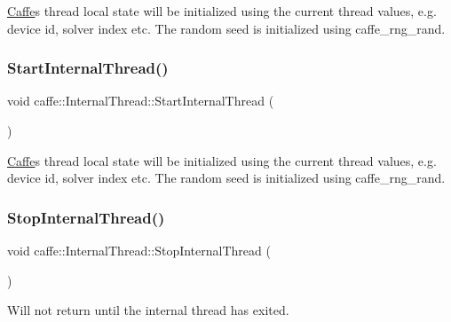 \mbox{\hyperlink{classcaffe_1_1_caffe}{Caffe}}\textquotesingle{}s thread local state will be initialized using the current thread values, e.\+g. device id, solver index etc. The random seed is initialized using caffe\+\_\+rng\+\_\+rand. \mbox{\label{classcaffe_1_1_internal_thread_acffc1d9bc9e78f4146ba2d16f593fca7}} 
\subsubsection{\texorpdfstring{Start\+Internal\+Thread()}{StartInternalThread()}\hspace{0.1cm}{\footnotesize\ttfamily [2/2]}}
{\footnotesize\ttfamily void caffe\+::\+Internal\+Thread\+::\+Start\+Internal\+Thread (\begin{DoxyParamCaption}{ }\end{DoxyParamCaption})}

\mbox{\hyperlink{classcaffe_1_1_caffe}{Caffe}}\textquotesingle{}s thread local state will be initialized using the current thread values, e.\+g. device id, solver index etc. The random seed is initialized using caffe\+\_\+rng\+\_\+rand. \mbox{\label{classcaffe_1_1_internal_thread_ac72d8e2a23dbbe5203d5003dd67af73e}} 
\subsubsection{\texorpdfstring{Stop\+Internal\+Thread()}{StopInternalThread()}\hspace{0.1cm}{\footnotesize\ttfamily [1/2]}}
{\footnotesize\ttfamily void caffe\+::\+Internal\+Thread\+::\+Stop\+Internal\+Thread (\begin{DoxyParamCaption}{ }\end{DoxyParamCaption})}

Will not return until the internal thread has exited. \mbox{\label{classcaffe_1_1_internal_thread_ac72d8e2a23dbbe5203d5003dd67af73e}} 
